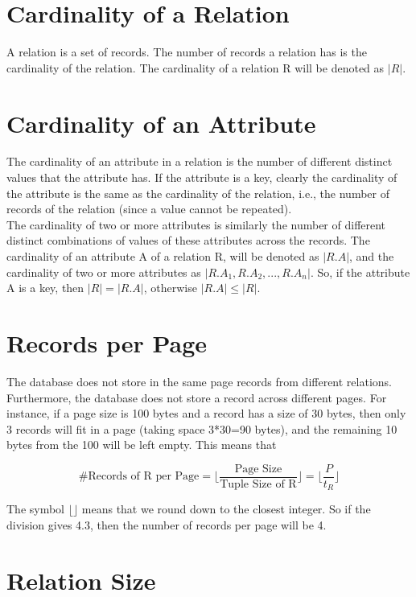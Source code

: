 \documentclass[11pt]{article}
\begin{document}
\section{Cardinality of a Relation}

A relation is a set of records. The number of records a relation has is the cardinality of the relation. The cardinality of a relation R will be denoted as $|R|$.

\section{Cardinality of an Attribute}

The cardinality of an attribute in a relation is the number of different distinct values that the attribute has. If the attribute is a key, clearly the cardinality of the attribute is the same as the cardinality of the relation, i.e., the number of records of the relation (since a value cannot be repeated). \\
The cardinality of two or more attributes is similarly the number of different distinct combinations of values of these attributes across the records.
The cardinality of an attribute A of a relation R, will be denoted as $|R.A|$, and the cardinality of two or more attributes as $|R.A_1, R.A_2, ..., R.A_n|$. So, if the attribute A is a key, then $|R| = |R.A|$, otherwise $|R.A| \le |R|$.

\section{Records per Page}
The database does not store in the same page records from different relations. Furthermore, the database does not store a record across different pages. For instance, if a page size is 100 bytes and a record has a size of 30 bytes, then only 3 records will fit in a page (taking space 3*30=90 bytes), and the remaining 10 bytes from the 100 will be left empty. This means that

$$
\text{\#Records of R per Page} = \Big\lfloor\frac{\text{Page Size}}{\text{Tuple Size of R}}\Big\rfloor = \Big\lfloor\frac{P}{t_R}\Big\rfloor
$$

The symbol $\lfloor \rfloor$ means that we round down to the closest integer. So if the division gives 4.3, then the number of records per page will be 4.

\section{Relation Size}
\end{document}
